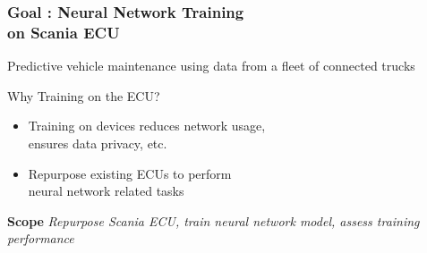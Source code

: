 \documentclass{beamer}
\begin{document}
\begin{frame}
  \frametitle{Goal : Neural Network Training \\ on Scania ECU}

    Predictive vehicle maintenance using data from a fleet of connected trucks
  \vskip 0.5cm

    Why Training on the ECU?
    \begin{itemize}
      \item Training on devices reduces network usage, \\ ensures data privacy, etc.
      \item Repurpose existing ECUs to perform \\ neural network related tasks
    \end{itemize}

  \vskip 0.5cm
    \textbf{Scope} \textit{Repurpose Scania ECU, train neural network model, assess training performance}

\end{frame}
\end{document}
